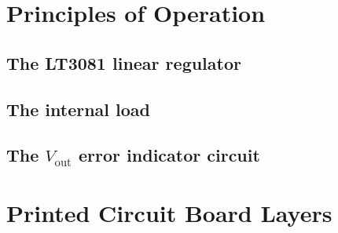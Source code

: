 \documentclass[letterpaper,twocolumn,11pt]{article}
\begin{document}
\section{Principles of Operation}

\subsection{The LT3081 linear regulator}\label{sec:lt3081}

\subsection{The internal load}\label{sec:int_load}

\subsection{The $V_\text{out}$ error indicator circuit}\label{sec:how_offset}

\clearpage



\section{Printed Circuit Board Layers}











\end{document}
